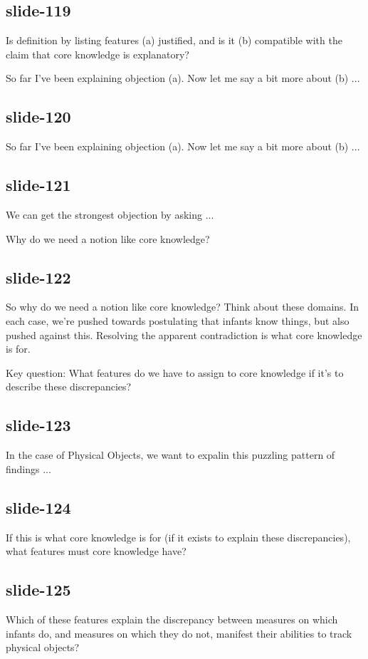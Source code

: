 \documentclass[12pt,\papersize]{extarticle}
\begin{document}
\subsection{slide-119}
Is definition by listing features (a) justified, and is it (b) compatible with the claim that core knowledge is explanatory?






So far I've been explaining objection (a).  Now let me say a bit more about (b) ...




\subsection{slide-120}
So far I've been explaining objection (a).  Now let me say a bit more about (b) ...

\subsection{slide-121}
We can get the strongest objection by asking ...

Why do we need a notion like core knowledge?

\subsection{slide-122}
So why do we need a notion like core knowledge?
Think about these domains.
In each case, we're pushed towards postulating that infants know things, but
also pushed against this.
Resolving the apparent contradiction is what core knowledge is for.

Key question: What features do we have to assign to core knowledge if it's to
describe these discrepancies?

\subsection{slide-123}
In the case of Physical Objects, we want to  expalin this
puzzling pattern of findings ...

\subsection{slide-124}
If this is what core knowledge is for (if it exists to explain these discrepancies), what
features must core knowledge have?

\subsection{slide-125}
Which of these features explain the discrepancy between
measures on which infants do, and measures on which they do not,
manifest their abilities to track physical objects?
\end{document}
